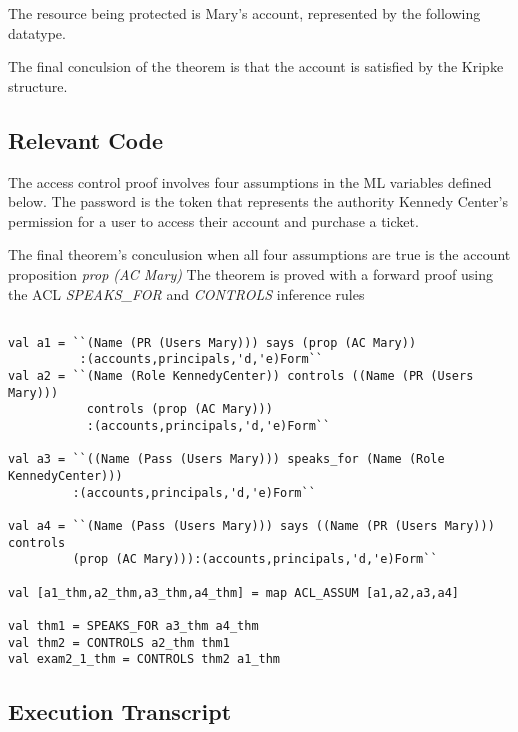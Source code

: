 \documentclass[11pt, twoside]{article}
\begin{document}
The resource being protected is Mary's account, represented by the following datatype.

The final conculsion of the theorem is that the account is satisfied by the Kripke structure.


\subsection{Relevant Code}
\label{sec:relevant-code}

The access control proof involves four assumptions in the ML variables defined below. The password is the token
that represents the authority Kennedy Center's permission for a user to access their account and purchase a ticket.

The final theorem's conculusion when all four assumptions are true is the account proposition \textit{prop (AC Mary)}
The theorem is proved with a forward proof using the ACL \textit{SPEAKS_FOR} and \textit{CONTROLS} inference rules

\lstset{frameround=fftt}
\begin{lstlisting}

val a1 = ``(Name (PR (Users Mary))) says (prop (AC Mary))
          :(accounts,principals,'d,'e)Form``
val a2 = ``(Name (Role KennedyCenter)) controls ((Name (PR (Users Mary)))
           controls (prop (AC Mary)))
	   	   :(accounts,principals,'d,'e)Form``

val a3 = ``((Name (Pass (Users Mary))) speaks_for (Name (Role KennedyCenter)))
         :(accounts,principals,'d,'e)Form``

val a4 = ``(Name (Pass (Users Mary))) says ((Name (PR (Users Mary))) controls 
         (prop (AC Mary))):(accounts,principals,'d,'e)Form``

val [a1_thm,a2_thm,a3_thm,a4_thm] = map ACL_ASSUM [a1,a2,a3,a4]

val thm1 = SPEAKS_FOR a3_thm a4_thm
val thm2 = CONTROLS a2_thm thm1
val exam2_1_thm = CONTROLS thm2 a1_thm

\end{lstlisting}

\subsection{Execution Transcript}
\label{sec:execution-transcript}


\end{document}
